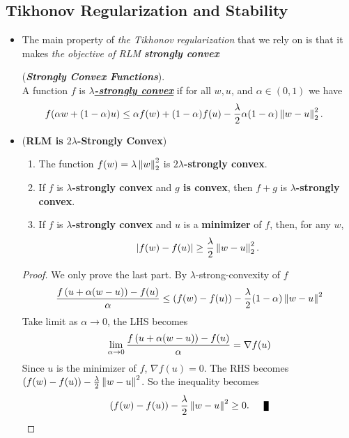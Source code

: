\documentclass[11pt]{article}
\begin{document}
\subsection{Tikhonov Regularization and Stability}
\begin{itemize}
\item The main property of \emph{the Tikhonov regularization} that we rely on is that it makes \emph{the objective of RLM} \emph{\textbf{strongly convex}}
\begin{definition} (\textbf{\emph{Strongly Convex Functions}}). \\
A function $f$ is \underline{\textbf{\emph{$\lambda$-strongly convex}}} if for all $w, u$, and  $\alpha \in (0, 1)$ we have
\begin{align*}
f(\alpha w+ (1 - \alpha) u ) &\le \alpha f(w)+ (1 - \alpha) f(u) - \frac{\lambda}{2} \alpha(1-\alpha)\left\|w - u\right\|_{2}^2.
\end{align*}
\end{definition}

\item \begin{lemma}(\textbf{RLM is $2\lambda$-Strongly Convex})  \citep{shalev2014understanding}
\begin{enumerate}
\item The function $f(w) = \lambda\left\|w\right\|_{2}^2$ is \textbf{$2\lambda$-strongly convex}.
\item If $f$ is \textbf{$\lambda$-strongly convex} and \textbf{$g$ is convex}, then $f + g$ is \textbf{$\lambda$-strongly convex}.
\item If $f$ is \textbf{$\lambda$-strongly convex} and $u$ is a \textbf{minimizer} of $f$, then, for any $w$,
\begin{align*}
\left\lvert f(w) - f(u) \right\rvert \ge \frac{\lambda}{2}\left\|w - u\right\|_{2}^2.
\end{align*}
\end{enumerate} 
\end{lemma}
\begin{proof}
We only prove the last part. By $\lambda$-strong-convexity of $f$
\begin{align*}
\frac{f\left(u + \alpha(w - u)\right) - f(u)}{\alpha} \le \left(f(w) - f(u)\right) - \frac{\lambda}{2}(1- \alpha)\left\|w - u\right\|_{}^2
\end{align*} Take limit as $\alpha \to 0$, the LHS becomes
\begin{align*}
\lim\limits_{\alpha \to 0}\frac{f\left(u + \alpha(w - u)\right) - f(u)}{\alpha} = \nabla f(u)
\end{align*} Since $u$ is the minimizer of $f$, $\nabla f(u) = 0$. The RHS becomes $\left(f(w) - f(u)\right) - \frac{\lambda}{2}\left\|w - u\right\|_{}^2$. So the inequality becomes
\begin{align*}
\paren{f(w) - f(u)} - \frac{\lambda}{2}\norm{w - u}{}^2 \ge 0. \qed
\end{align*}
\end{proof}




\end{itemize}
\end{document}
